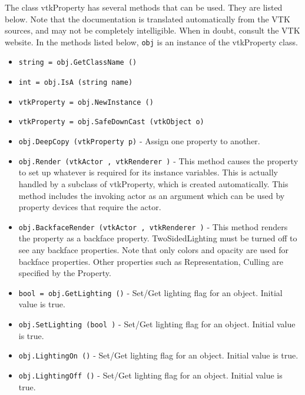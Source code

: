 The class vtkProperty has several methods that can be used.
  They are listed below.
Note that the documentation is translated automatically from the VTK sources,
and may not be completely intelligible.  When in doubt, consult the VTK website.
In the methods listed below, \verb|obj| is an instance of the vtkProperty class.
\begin{itemize}
\item  \verb|string = obj.GetClassName ()|

\item  \verb|int = obj.IsA (string name)|

\item  \verb|vtkProperty = obj.NewInstance ()|

\item  \verb|vtkProperty = obj.SafeDownCast (vtkObject o)|

\item  \verb|obj.DeepCopy (vtkProperty p)| -  Assign one property to another. 

\item  \verb|obj.Render (vtkActor , vtkRenderer )| -  This method causes the property to set up whatever is required for
 its instance variables. This is actually handled by a subclass of
 vtkProperty, which is created automatically. This
 method includes the invoking actor as an argument which can
 be used by property devices that require the actor.

\item  \verb|obj.BackfaceRender (vtkActor , vtkRenderer )| -  This method renders the property as a backface property. TwoSidedLighting
 must be turned off to see any backface properties. Note that only
 colors and opacity are used for backface properties. Other properties
 such as Representation, Culling are specified by the Property.

\item  \verb|bool = obj.GetLighting ()| -  Set/Get lighting flag for an object. Initial value is true.

\item  \verb|obj.SetLighting (bool )| -  Set/Get lighting flag for an object. Initial value is true.

\item  \verb|obj.LightingOn ()| -  Set/Get lighting flag for an object. Initial value is true.

\item  \verb|obj.LightingOff ()| -  Set/Get lighting flag for an object. Initial value is true.


\end{itemize}
